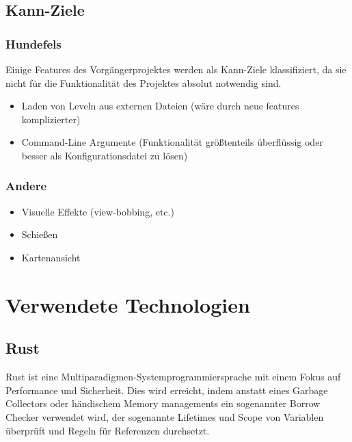\documentclass[a4paper,titlepage]{article}
\begin{document}
    \subsection{Kann-Ziele}
    
    \subsubsection*{Hundefels}
    
    Einige Features des Vorgängerprojektes werden als Kann-Ziele klassifiziert, da sie nicht für die Funktionalität des Projektes absolut notwendig sind.
    
    \begin{itemize}
        \item Laden von Leveln aus externen Dateien (wäre durch neue features komplizierter)
        \item Command-Line Argumente (Funktionalität größtenteils überflüssig oder besser als Konfigurationsdatei zu lösen)
    \end{itemize}
    
    \subsubsection*{Andere}
    
    \begin{itemize}
        \item Visuelle Effekte (view-bobbing, etc.)
        \item Schießen
        \item Kartenansicht
    \end{itemize}
    
    
    \newpage
    
    \section{Verwendete Technologien}
    
    \subsection{Rust}
    
    Rust ist eine Multiparadigmen-Systemprogrammiersprache mit einem Fokus auf Performance und Sicherheit. Dies wird erreicht, indem anstatt eines Garbage Collectors oder händischem Memory managements ein sogenannter Borrow Checker verwendet wird, der sogenannte Lifetimes und Scope von Variablen überprüft und Regeln für Referenzen durchsetzt.
    
\end{document}
